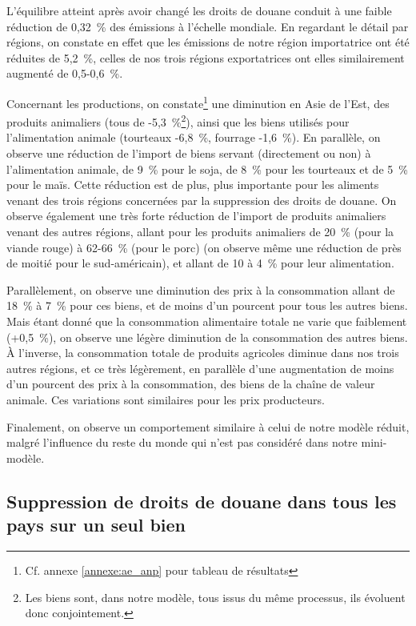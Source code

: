 L'équilibre atteint après avoir changé les droits de douane conduit à une faible réduction de 0,32~\% des émissions à l'échelle mondiale. En regardant le détail par régions, on constate en effet que les émissions de notre région importatrice ont été réduites de 5,2~\%, celles de nos trois régions exportatrices ont elles similairement augmenté de 0,5-0,6~\%.

Concernant les productions, on constate\footnote{Cf. annexe \ref{annexe:ae_anp} pour tableau de résultats} une diminution en Asie de l'Est, des produits animaliers (tous de -5,3~\%\footnote{Les biens sont, dans notre modèle, tous issus du même processus, ils évoluent donc conjointement.}), ainsi que les biens utilisés pour l'alimentation animale (tourteaux -6,8~\%, fourrage -1,6~\%). En parallèle, on observe une réduction de l'import de biens servant (directement ou non) à l'alimentation animale, de 9~\% pour le soja, de 8~\% pour les tourteaux et de 5~\% pour le maïs. Cette réduction est de plus, plus importante pour les aliments venant des trois régions concernées par la suppression des droits de douane. On observe également une très forte réduction de l'import de produits animaliers venant des autres régions, allant pour les produits animaliers de 20~\% (pour la viande rouge) à 62-66~\% (pour le porc) (on observe même une réduction de près de moitié pour le sud-américain), et allant de 10 à 4~\% pour leur alimentation.

Parallèlement, on observe une diminution des prix à la consommation allant de 18~\% à 7~\% pour ces biens, et de moins d'un pourcent pour tous les autres biens. Mais étant donné que la consommation alimentaire totale ne varie que faiblement (+0,5~\%), on observe une légère diminution de la consommation des autres biens. À l'inverse, la consommation totale de produits agricoles diminue dans nos trois autres régions, et ce très légèrement, en parallèle d'une augmentation de moins d'un pourcent des prix à la consommation, des biens de la chaîne de valeur animale. Ces variations sont similaires pour les prix producteurs.

Finalement, on observe un comportement similaire à celui de notre modèle réduit, malgré l'influence du reste du monde qui n'est pas considéré dans notre mini-modèle.


\subsection{Suppression de droits de douane dans tous les pays sur un seul bien}

